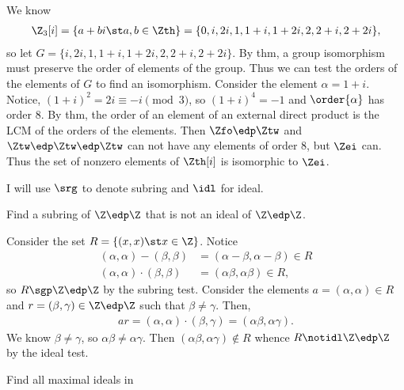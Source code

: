 \documentclass{article}
\begin{document}
\begin{solution} %
  We know \begin{align*}
    \Z_3[i] = \{a+bi \st a,b\in\Zth\} = \{0, i, 2i, 1, 1+i, 1+2i, 2, 2+i, 2+2i\},
  \end{align*}
  so let \( G = \{i, 2i, 1, 1+i, 1+2i, 2, 2+i, 2+2i\} \).
  By thm, a group isomorphism must preserve the order of elements of the group.
  Thus we can test the orders of the elements of \( G \) to find an isomorphism.
  Consider the element \( \alpha=1+i \).
  Notice, \( (1+i)^2 = 2i \equiv -i \pmod 3 \), so \( (1+i)^4 = -1 \) and \( \order{\alpha} \) has order 8.
  By thm, the order of an element of an external direct product is the LCM of the orders of the elements.
  Then \( \Zfo\edp\Ztw \) and \( \Ztw\edp\Ztw\edp\Ztw \) can not have any elements of order 8, but \( \Zei \) can.
  Thus the set of nonzero elements of \( \Zth[i] \) is isomorphic to \( \Zei \).
\end{solution}

\begin{note}[Notation]
  I will use \( \srg \) to denote subring and \( \idl \) for ideal.
\end{note}

Find a subring of \( \Z\edp\Z \) that is not an ideal of \( \Z\edp\Z \).

\begin{solution} %
Consider the set \( R = \{(x,x)\st x\in\Z\} \).
Notice \begin{align}
  (\alpha,\alpha) - (\beta,\beta) &= (\alpha-\beta, \alpha-\beta) \in R \label{srt c1}\\
  (\alpha,\alpha) \cdot (\beta,\beta) &= (\alpha\beta,\alpha\beta) \in R,
\end{align}
so \( R\sgp\Z\edp\Z \) by the subring test. Consider the elements \( a=(\alpha,\alpha)\in R \) and \( r = (\beta, \gamma) \in \Z\edp\Z \) such that \( \beta\neq\gamma \). Then,
\begin{align*}
  ar = (\alpha,\alpha)\cdot (\beta,\gamma) = (\alpha\beta, \alpha\gamma).
\end{align*}
We know \( \beta\neq\gamma \), so \( \alpha\beta\neq\alpha\gamma \). Then \( (\alpha\beta,\alpha\gamma) \notin R \) whence \( R\notidl \Z\edp\Z \) by the ideal test.


\end{solution}

Find all maximal ideals in

 \Zei \qquad {}  \qquad {}  \qquad {}\Zn
\end{document}
